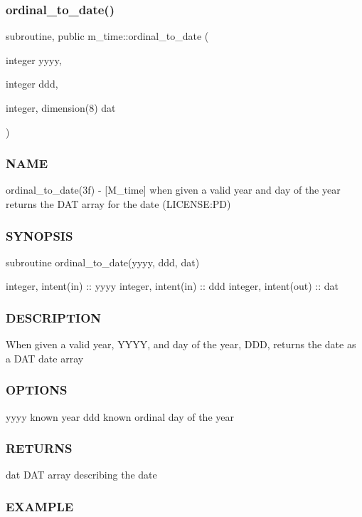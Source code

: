 \subsubsection{\texorpdfstring{ordinal\+\_\+to\+\_\+date()}{ordinal\_to\_date()}}
{\footnotesize\ttfamily subroutine, public m\+\_\+time\+::ordinal\+\_\+to\+\_\+date (\begin{DoxyParamCaption}\item[{integer}]{yyyy,  }\item[{integer}]{ddd,  }\item[{integer, dimension(8)}]{dat }\end{DoxyParamCaption})}



\subsubsection*{N\+A\+ME}

ordinal\+\_\+to\+\_\+date(3f) -\/ \mbox{[}M\+\_\+time\mbox{]} when given a valid year and day of the year returns the D\+AT array for the date (L\+I\+C\+E\+N\+SE\+:PD) \subsubsection*{S\+Y\+N\+O\+P\+S\+IS}

subroutine ordinal\+\_\+to\+\_\+date(yyyy, ddd, dat)

integer, intent(in) \+:\+: yyyy integer, intent(in) \+:\+: ddd integer, intent(out) \+:\+: dat \subsubsection*{D\+E\+S\+C\+R\+I\+P\+T\+I\+ON}

When given a valid year, Y\+Y\+YY, and day of the year, D\+DD, returns the date as a D\+AT date array \subsubsection*{O\+P\+T\+I\+O\+NS}

yyyy known year ddd known ordinal day of the year \subsubsection*{R\+E\+T\+U\+R\+NS}

dat D\+AT array describing the date \subsubsection*{E\+X\+A\+M\+P\+LE}

